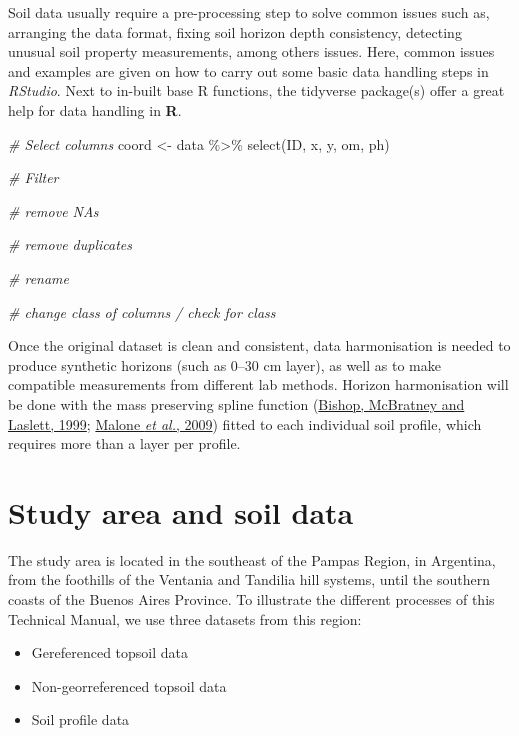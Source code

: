 \documentclass[
  10pt,
  b5paper,
  oneside]{book}
\newenvironment{Shaded}{\begin{snugshade}}{\end{snugshade}}
\newcommand{\CommentTok}[1]{\textcolor[rgb]{0.56,0.35,0.01}{\textit{#1}}}
\newcommand{\FunctionTok}[1]{\textcolor[rgb]{0.00,0.00,0.00}{#1}}
\newcommand{\NormalTok}[1]{#1}
\newcommand{\OtherTok}[1]{\textcolor[rgb]{0.56,0.35,0.01}{#1}}
\newcommand{\SpecialCharTok}[1]{\textcolor[rgb]{0.00,0.00,0.00}{#1}}
\providecommand{\tightlist}{%
  \setlength{\itemsep}{0pt}\setlength{\parskip}{0pt}}
\begin{document}
Soil data usually require a pre-processing step to solve common issues such as, arranging the data format, fixing soil horizon depth consistency, detecting unusual soil property measurements, among others issues. Here, common issues and examples are given on how to carry out some basic data handling steps in \emph{RStudio}. Next to in-built base R functions, the tidyverse package(s) offer a great help for data handling in \textbf{R}.

\begin{Shaded}
\begin{Highlighting}[]
\CommentTok{\# Select columns}
\NormalTok{coord }\OtherTok{\textless{}{-}}\NormalTok{ data }\SpecialCharTok{\%\textgreater{}\%} \FunctionTok{select}\NormalTok{(ID, x, y, om, ph)}

\CommentTok{\# Filter}

\CommentTok{\# remove NAs}


\CommentTok{\# remove duplicates}





\CommentTok{\# rename}

\CommentTok{\# change class of columns / check for class}
\end{Highlighting}
\end{Shaded}

Once the original dataset is clean and consistent, data harmonisation is needed to produce synthetic horizons (such as 0--30 cm layer), as well as to make compatible measurements from different lab methods. Horizon harmonisation will be done with the mass preserving spline function (\protect\hyperlink{ref-Bishop1999}{Bishop, McBratney and Laslett, 1999}; \protect\hyperlink{ref-Malone2009}{Malone \emph{et al.}, 2009}) fitted to each individual soil profile, which requires more than a layer per profile.

\hypertarget{study-area-and-soil-data}{%
\section{Study area and soil data}\label{study-area-and-soil-data}}

The study area is located in the southeast of the Pampas Region, in Argentina, from the foothills of the Ventania and Tandilia hill systems, until the southern coasts of the Buenos Aires Province.
To illustrate the different processes of this Technical Manual, we use three datasets from this region:

\begin{itemize}
\tightlist
\item
  Gereferenced topsoil data
\item
  Non-georreferenced topsoil data
\item
  Soil profile data
\end{itemize}
\end{document}
